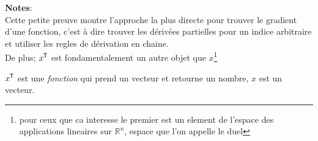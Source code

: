\textbf{Notes}:\\
Cette petite preuve montre l'approche la plus directe pour trouver le gradient
d'une fonction, c'est \`a dire trouver les d\'eriv\'ees partielles pour un
indice arbitraire et utiliser les regles de d\'erivation en chaine.\\
De plus; $x^{\mkern-1.5mu\mathsf{T}}$ est fondamentalement un autre objet que $x$\footnote{pour
ceux que ca interesse le premier est un element de l'espace des applications
lineaires sur $\mathbb R^n$, espace que l'on appelle le duel}

$x^{\mkern-1.5mu\mathsf{T}}$ est une \emph{fonction} qui prend un vecteur et retourne un nombre,
$x$ est un vecteur.






